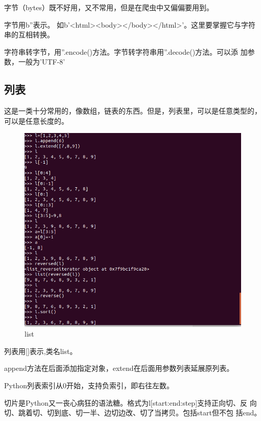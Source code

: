 \documentclass[11pt,UTF8,oneside]{mybook}
\begin{document}
字节（bytes）既不好用，又不常用，但是在爬虫中又偏偏要用到。

字节用b''表示。
如b'<html><body></body></html>'。这里要掌握它与字符串的互相转换。

字符串转字节，用''.encode()方法。字节转字符串用''.decode()方法。可以添
加参数，一般为'UTF-8'

\subsection{列表}
\label{sec:list}

这是一类十分常用的，像数组，链表的东西。但是，列表里，可以是任意类型的，
可以是任意长度的。

\begin{figure}[htb]
  \centering \includegraphics[width=\textwidth]{./figure/list.png}
  \caption{list}
  \label{fig:list}
\end{figure}

列表用[]表示,类名list。

append方法在后面添加指定对象，extend在后面用参数列表延展原列表。

Python列表索引从0开始，支持负索引，即右往左数。

切片是Python又一丧心病狂的语法糖。格式为l[start:end:step]支持正向切、反
向切、跳着切、切到底、切一半、边切边改、切了当拷贝。包括start但不包
括end。

\end{document}
